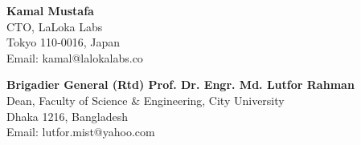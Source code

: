 
{\color{black}\fontsize{9.5}{12}\selectfont

\begin{minipage}[t]{0.48\textwidth}
\textbf{Kamal Mustafa}\\
CTO, LaLoka Labs\\
Tokyo 110‑0016, Japan\\
Email: kamal@lalokalabs.co
\end{minipage}
\hfill
\begin{minipage}[t]{0.48\textwidth}
\textbf{Brigadier General (Rtd) Prof. Dr. Engr. Md. Lutfor Rahman}\\
Dean, Faculty of Science \& Engineering, City University\\
Dhaka 1216, Bangladesh\\
Email: lutfor.mist@yahoo.com
\end{minipage}


}







      

